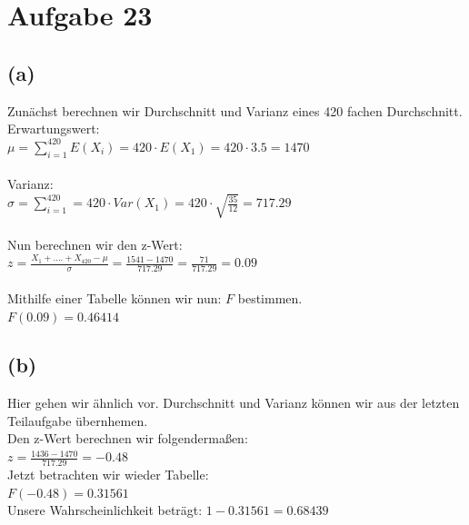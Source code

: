 \documentclass[a4paper]{scrartcl}
\begin{document}
\section*{Aufgabe 23}
\subsection*{(a)}
Zunächst berechnen wir Durchschnitt und Varianz  eines 420 fachen Durchschnitt.\\
Erwartungswert:\\
$\mu = \sum_{i=1}^{420}E(X_i) = 420 \cdot E(X_1) = 420 \cdot 3.5 = 1470$
\\
\\
Varianz:\\
$\sigma = \sum_{i = 1}^{420} = 420 \cdot Var(X_1) = 420 \cdot \sqrt{\frac{35}{12}} = 717.29$
\\
\\
Nun berechnen wir den z-Wert:\\
$z = \frac{X_1 + .... + X_420-\mu}{\sigma} = \frac{1541-1470}{717.29} = \frac{71}{717.29} = 0.09$
\\
\\
Mithilfe einer Tabelle können wir nun: $F$ bestimmen.\\
$F(0.09) = 0.46414$

\subsection*{(b)}
Hier gehen wir ähnlich vor. Durchschnitt und Varianz können wir aus der letzten Teilaufgabe übernhemen.\\
Den z-Wert berechnen wir folgendermaßen:\\
$z = \frac{1436 - 1470}{717.29} = -0.48$\\
Jetzt betrachten wir wieder Tabelle:\\
$F(-0.48) = 0.31561$\\
Unsere Wahrscheinlichkeit beträgt: $1 - 0.31561 =0.68439$
\end{document}
